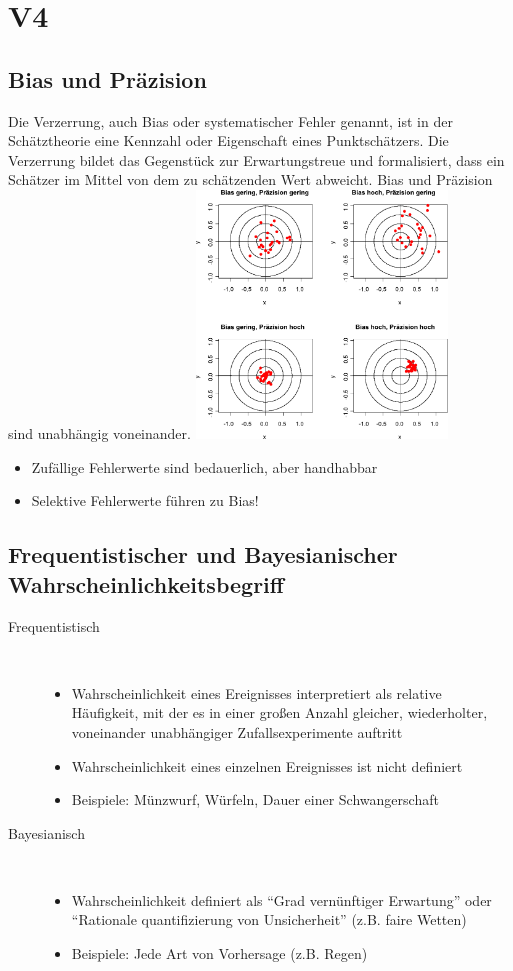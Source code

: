 \section{V4}
\subsection{Bias und Präzision}
Die Verzerrung, auch Bias oder systematischer Fehler genannt, ist in der Schätztheorie eine Kennzahl oder Eigenschaft eines Punktschätzers. Die Verzerrung bildet das Gegenstück zur Erwartungstreue und formalisiert, dass ein Schätzer im Mittel von dem zu schätzenden Wert abweicht.
Bias und Präzision sind unabhängig voneinander.
\includegraphics[width=0.5\textwidth]{lectures/V4/pix/bias_precision.pdf}
\begin{itemize}
    \item Zufällige Fehlerwerte sind bedauerlich, aber handhabbar
    \item Selektive Fehlerwerte führen zu Bias!
\end{itemize}

\subsection{Frequentistischer und Bayesianischer Wahrscheinlichkeitsbegriff}
\begin{description}
    \item[Frequentistisch] ~
        \begin{itemize}
            \item Wahrscheinlichkeit eines Ereignisses interpretiert als relative Häufigkeit, mit der es in einer großen Anzahl gleicher, wiederholter, voneinander unabhängiger Zufallsexperimente auftritt
            \item Wahrscheinlichkeit eines einzelnen Ereignisses ist nicht definiert
            \item Beispiele: Münzwurf, Würfeln, Dauer einer Schwangerschaft
        \end{itemize}
    \item[Bayesianisch] ~
        \begin{itemize}
            \item Wahrscheinlichkeit definiert als ``Grad vernünftiger Erwartung'' oder ``Rationale quantifizierung von Unsicherheit'' (z.B. faire Wetten)
            \item Beispiele: Jede Art von Vorhersage (z.B. Regen)
        \end{itemize}
\end{description}

